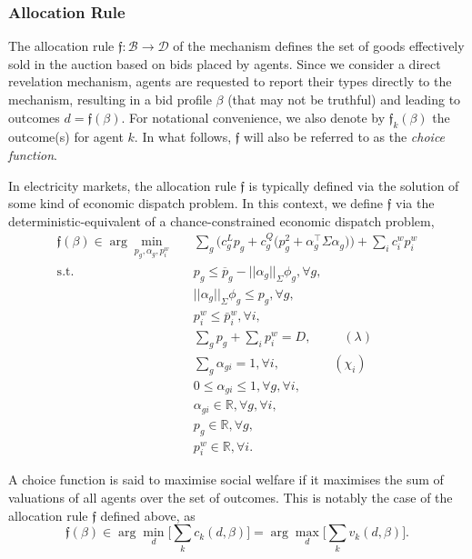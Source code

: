 \documentclass{article}
\begin{document}
\subsubsection{Allocation Rule}

The allocation rule $\mathfrak{f}: \mathcal{B} \rightarrow \mathcal{D}$ of the mechanism defines the set of goods effectively sold in the auction based on bids placed by agents. Since we consider a direct revelation mechanism, agents are requested to report their types directly to the mechanism, resulting in a bid profile $\beta$ (that may not be truthful) and leading to outcomes $d = \mathfrak{f}(\beta)$. For notational convenience, we also denote by $\mathfrak{f}_k(\beta)$ the outcome(s) for agent $k$. In what follows, $\mathfrak{f}$ will also be referred to as the \textit{choice function}.

In electricity markets, the allocation rule $\mathfrak{f}$ is typically defined via the solution of some kind of economic dispatch problem. In this context, we define $\mathfrak{f}$ via the deterministic-equivalent of a chance-constrained economic dispatch problem,
\begin{align}
\mathfrak{f}(\beta) \in \arg \underset{p_g, \alpha_g,p_i^w}{\min} \hspace{10pt} & \sum_g \Big(c_g^L p_g + c_g^Q \big(p_g^2 + \alpha_g^\top \Sigma \alpha_g\big)\Big) + \sum_i c_i^w p_i^w \\
\mbox{s.t. } & p_g \le \overline{p}_g - ||\alpha_g||_{\Sigma} \phi_g,\forall g,\\
& ||\alpha_g||_{\Sigma} \phi_g \le p_g,\forall g,\\
& p_i^w \le \bar{p}_i^w, \forall i,\\
& \sum_g p_g + \sum_i p_i^w = D, \hspace{30pt} (\lambda)\\
& \sum_g \alpha_{gi} = 1, \forall i, \hspace{50pt} (\chi_i)\\
& 0 \le \alpha_{gi} \le 1, \forall g, \forall i,\\
& \alpha_{gi} \in \mathbb{R}, \forall g, \forall i,\\
& p_g \in \mathbb{R}, \forall g,\\
& p_i^w \in \mathbb{R}, \forall i.
\end{align}

A choice function is said to maximise social welfare if it maximises the sum of valuations of all agents over the set of outcomes. This is notably the case of the allocation rule $\mathfrak{f}$ defined above, as 
\begin{equation*}
\mathfrak{f}(\beta) \in \arg \min_d \bigg[\sum_k c_k(d, \beta)\bigg] = \arg \max_d \bigg[\sum_k v_k(d, \beta) \bigg].
\end{equation*}
\end{document}
